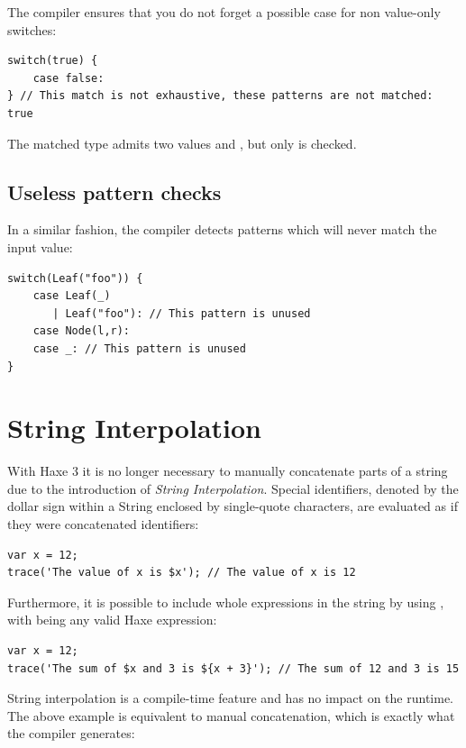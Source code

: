 \documentclass{haxe}
\begin{document}
The compiler ensures that you do not forget a possible case for non value-only switches:

\begin{lstlisting}
switch(true) {
    case false:
} // This match is not exhaustive, these patterns are not matched: true
\end{lstlisting}

The matched type  admits two values  and , but only  is checked. 


\subsection{Useless pattern checks}
\label{lf-pattern-matching-unused}

In a similar fashion, the compiler detects patterns which will never match the input value:

\begin{lstlisting}
switch(Leaf("foo")) {
    case Leaf(_)
       | Leaf("foo"): // This pattern is unused
    case Node(l,r):
    case _: // This pattern is unused
}
\end{lstlisting}



\section{String Interpolation}
\label{lf-string-interpolation}

With Haxe 3 it is no longer necessary to manually concatenate parts of a string due to the introduction of \emph{String Interpolation}. Special identifiers, denoted by the dollar sign \expr{\$} within a String enclosed by single-quote  characters, are evaluated as if they were concatenated identifiers:

\begin{lstlisting}
var x = 12;
trace('The value of x is $x'); // The value of x is 12
\end{lstlisting}
Furthermore, it is possible to include whole expressions in the string by using , with  being any valid Haxe expression:

\begin{lstlisting}
var x = 12;
trace('The sum of $x and 3 is ${x + 3}'); // The sum of 12 and 3 is 15
\end{lstlisting} 
String interpolation is a compile-time feature and has no impact on the runtime. The above example is equivalent to manual concatenation, which is exactly what the compiler generates:
\end{document}
